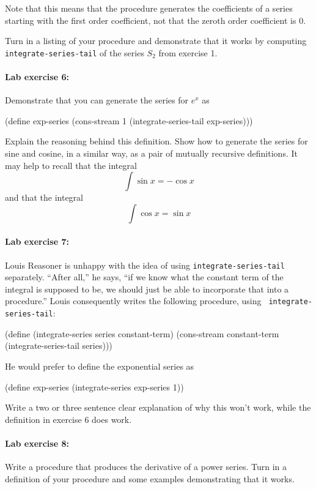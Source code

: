 Note that this means that the procedure generates the coefficients of
a series starting with the first order coefficient, not that the
zeroth order coefficient is 0.

Turn in a listing of your procedure and demonstrate that it works by
computing {\tt integrate-series-tail} of the series $S_2$ from
exercise 1.

\paragraph{Lab exercise 6:} Demonstrate that you can generate the
series for $e^x$ as

\beginlisp
(define exp-series
  (cons-stream 1 (integrate-series-tail exp-series)))
\endlisp

\noindent Explain the reasoning behind this definition.  Show how to generate
the series for sine and cosine, in a similar way, as a pair of mutually
recursive definitions.  It may help to recall that the integral 
\[\int \sin x =  - \cos x\]
and that the integral
\[\int \cos x = \sin x\]


\paragraph{Lab exercise 7:} Louis Reasoner is unhappy with the idea
of using {\tt integrate-series-tail} separately.  ``After all,'' he
says, ``if we know what the constant term of the integral is supposed
to be, we should just be able to incorporate that into a procedure.''
Louis consequently writes the following procedure, using {\tt
integrate-series-tail}:

\beginlisp
(define (integrate-series series constant-term)
  (cons-stream constant-term (integrate-series-tail series)))
\endlisp

\noindent
He would prefer to define the exponential series as

\beginlisp 
(define exp-series
  (integrate-series exp-series 1))
\endlisp 

\noindent
Write a two or three sentence clear explanation of why this won't
work, while the definition in exercise 6 does work.

\paragraph{Lab exercise 8:} Write a procedure that produces the
derivative of a power series.  Turn in a definition of your procedure
and some examples demonstrating that it works.

